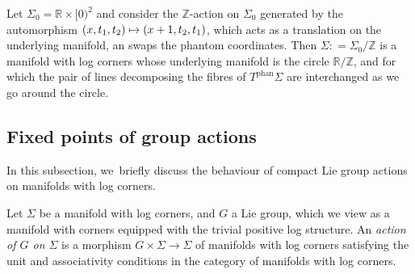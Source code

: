 \documentclass[JEP,XML,SOM,Unicode,NoFloatCountersInSection,published]{cedram}
\newcommand\mto{\mathchoice{\longmapsto}{\mapsto}{\mapsto}{\mapsto}}
\theoremstyle{definition}
\theoremstyle{remark}
\newenvironment{example}
  {\pushQED{\qed}\renewcommand{\qedsymbol}{$\lozenge$}\examplex}
  {\popQED\endexamplex}
\let\defn\emph
\newcommand{\RR}{\mathbb{R}}
\newcommand{\ZZ}{\mathbb{Z}}
\newcommand{\defas}{\mathrel{\mathop:}=}
\newcommand{\Sig}{\Sigma}
\newcommand{\phant}{\mathrm{phan}}
\newcommand{\tbphan}[2][]{T_{#1}^{\phant}#2}
\begin{document}
\begin{example}
Let $\Sig_0 = \RR \times [0)^2$ and consider the $\ZZ$-action on $\Sig_0$ generated by the automorphism $(x,t_1,t_2) \mto (x+1,t_2,t_1)$, which acts as a translation on the underlying manifold, an swaps the phantom coordinates. Then $\Sig\defas \Sig_0/\ZZ$ is a manifold with log corners whose underlying manifold is the circle $\RR/\ZZ$, and for which the pair of lines decomposing the fibres of $\tbphan{\Sig}$ are interchanged as we go around the circle.
\end{example}

\subsection{Fixed points of group actions} In this subsection, we~briefly discuss the behaviour of compact Lie group actions on manifolds with log corners.

\begin{definition}
Let $\Sig$ be a manifold with log corners, and $G$ a Lie group, which we view as a manifold with corners equipped with the trivial positive log structure. An \defn{action of $G$ on $\Sig$} is a morphism $G \times \Sig \to \Sig$ of manifolds with log corners satisfying the unit and associativity conditions in the category of manifolds with log corners.
\end{definition}
\end{document}
